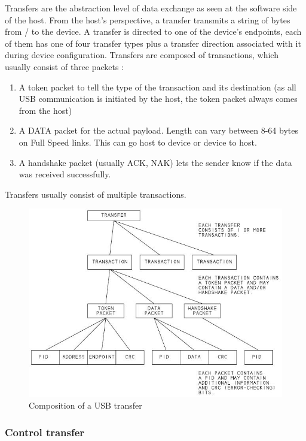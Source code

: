 \documentclass{article}
\begin{document}
Transfers are the abstraction level of data exchange as seen at the software
side of the host. From the host's perspective, a transfer transmits a string of
 bytes from / to the device. A transfer is directed to one of the device's endpoints,
each of them has one of four transfer types plus a transfer direction
associated with it during device configuration.
Transfers are composed of transactions, which usually consist of three
packets \cite[p. 209ff.]{usbstd}:

\begin{enumerate}
  \item A token packet to tell the type of the transaction and its destination
        (as all USB communication is initiated by the host, the token packet always comes
        from the host)
  \item A DATA packet for the actual payload. Length can vary between 8-64 bytes on Full Speed links.
        This can go host to device or device to host.
  \item A handshake packet (usually ACK, NAK) lets the sender know if the data was received successfully.
\end{enumerate}

Transfers usually consist of multiple transactions.

\begin{figure}[H]
  \caption{Composition of a USB transfer \cite[p. 44]{uc}}
  \centering
  \includegraphics[width=\textwidth]{images/transfer_tree.jpg}
\end{figure}

\subsubsection {Control transfer}
\end{document}
